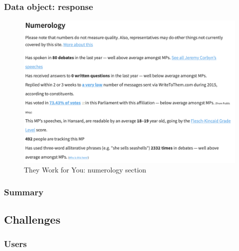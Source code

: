 \documentclass{article}
\begin{document}
        	\subsubsection*{Data object: response}
        	

			\begin{figure}[h]
				\centering
				\includegraphics[scale=0.5]{images/they-work-for-you-numerology}
				\caption{They Work for You: numerology section}
				\label{fig:they-work-for-you-numerology}
			\end{figure}

        	\subsubsection*{Summary}
        	
        	        	        	        	        	                	        	          	     	
        \subsection*{Challenges}
        
        	\subsubsection*{Users}
        	    
\end{document}
